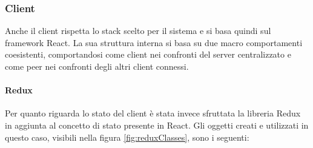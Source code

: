 \subsubsection{Client}
Anche il client rispetta lo stack scelto per il sistema e si basa quindi sul framework React. La sua struttura interna si basa su due macro comportamenti coesistenti, comportandosi come client nei confronti del server centralizzato e come peer nei confronti degli altri client connessi.

\paragraph{Redux}
Per quanto riguarda lo stato del client è stata invece sfruttata la libreria Redux in aggiunta al concetto di stato presente in React. Gli oggetti creati e utilizzati in questo caso, visibili nella figura \ref{fig:reduxClasses}, sono i seguenti:
